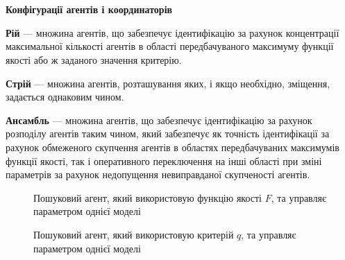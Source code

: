 \documentclass[14pt,handout,utf8]{beamer}
\newcommand{\Xhead}[1]{
 \begin{center}%
      \textbf{#1}%
 \end{center}%
}
\begin{document}
\begin{frame}
  \frametitle{~}

  \Xhead{Конфігурації агентів і координаторів}

  \textbf{Рій} --- множина агентів, що забезпечує ідентифікацію за рахунок
  концентрації максимальної кількості агентів в області передбачуваного максимуму
  функції якості або ж заданого значення критерію.

  \textbf{Стрій} --- множина агентів, розташування яких, і якщо необхідно,
  зміщення, задається однаковим чином.

  \textbf {Ансамбль} ---
  множина агентів, що забезпечує ідентифікацію за рахунок розподілу агентів таким
  чином, який забезпечує як точність ідентифікації за рахунок обмеженого
  скупчення агентів в областях передбачуваних максимумів функції якості, так і оперативного
  переключення на інші області при зміні параметрів за рахунок недопущення
  невиправданої скупченості агентів.

  \begin{figure}[htb!]
    \begin{center}
      
    \end{center}
    \caption{Пошуковий агент, який використовую функцію якості $F$, та управляє параметром однієї моделі}
    \label{atu:f:agent1}
  \end{figure}

  \vspace{-5ex}

  \begin{figure}[htb!]
    \begin{center}
      
    \end{center}
    \caption{Пошуковий агент, який використовую критерій $q$, та управляє параметром однієї моделі}
    \label{atu:f:agent1q}
  \end{figure}

\end{frame}


\end{document}

